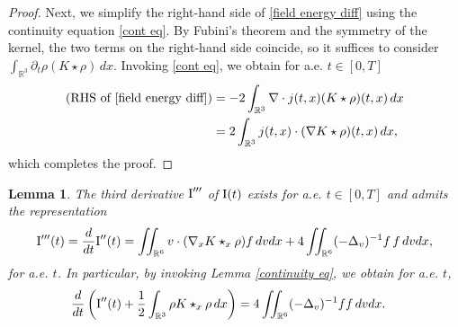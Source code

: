 \documentclass[reqno,11pt,final]{amsart}
\theoremstyle{plain}
\newtheorem{lemma}[theorem]{Lemma}
\numberwithin{equation}{section}
\numberwithin{theorem}{section}
\begin{document}
\begin{proof}
    Next, we simplify the right-hand side of \eqref{field energy diff} using the continuity equation \eqref{cont eq}. By Fubini's theorem and the symmetry of the kernel, the two terms on the right-hand side coincide, so it suffices to consider $\int_{\mathbb{R}^3} \partial_t\rho(K\star\rho)\,dx$. Invoking \eqref{cont eq}, we obtain for a.e. $t\in[0,T]$
    \begin{align*}
        (\textup{RHS of }\eqref{field energy diff}) &= -2\int_{\mathbb{R}^3} \nabla\cdot j(t,x) (K\star\rho)(t,x)\,dx\\
        &= 2\int_{\mathbb{R}^3} j(t,x)\cdot (\nabla K\star\rho)(t,x)\,dx,
    \end{align*}which completes the proof.
\end{proof}

\begin{lemma}The third derivative $\textup{I}'''$ of $\textup{I}(t)$ exists for a.e. $t\in[0,T]$ and admits the representation $$\textup{I}'''(t)=\frac{d}{dt}\textup{I}''(t)=\iint_{\mathbb{R}^6} v\cdot(\nabla_xK\star_x\rho)f\,dvdx+4\iint_{\mathbb{R}^6} (-\Delta_v)^{-1}f\,f\,dvdx,$$for a.e. $t$.
In particular, by invoking Lemma \ref{continuity eq}, we obtain for a.e. $t$,\label{I'''}
\begin{align}\label{Etot id}
\frac{d}{dt}\left(\textup{I}''(t) + \frac{1}{2} \int_{\mathbb{R}^3} \rho K\star_x \rho\,dx\right)&=4\iint_{\mathbb{R}^6} (-\Delta_v)^{-1}f f\,dvdx.
\end{align}
\end{lemma}
\end{document}
